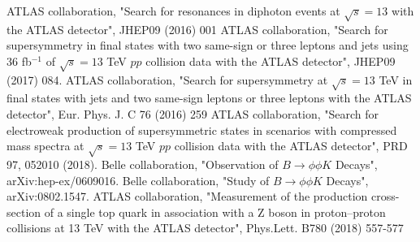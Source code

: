 \documentclass[12pt]{article}
\begin{document}

\begin{thebibliography}{999}
 ATLAS collaboration, "Search for resonances in diphoton events at $\sqrt{s} = 13$ with the ATLAS detector", JHEP09 (2016) 001
 ATLAS collaboration, "Search for supersymmetry in final states with two same-sign or three leptons and jets using 36 fb$^{-1}$ of $\sqrt{s} = 13$ TeV $pp$ collision data with the ATLAS detector", JHEP09 (2017) 084.
 ATLAS collaboration, "Search for supersymmetry at $\sqrt{s} = 13$ TeV in final states with jets and two same-sign leptons or three leptons with the ATLAS detector", Eur. Phys. J. C 76 (2016) 259
 ATLAS collaboration, "Search for electroweak production of supersymmetric states in scenarios with compressed mass spectra at $\sqrt{s} = 13$ TeV $pp$ collision data with the ATLAS detector", PRD 97, 052010 (2018).
 Belle collaboration, "Observation of $B \to \phi \phi K$ Decays", arXiv:hep-ex/0609016.
 Belle collaboration, "Study of $B \to \phi \phi K$ Decays", arXiv:0802.1547.
ATLAS collaboration, "Measurement of the production cross-section of a single top quark in association with a Z boson in proton–proton collisions at 13 TeV with the ATLAS detector", Phys.Lett. B780 (2018) 557-577
\end{thebibliography}
\end{document}
